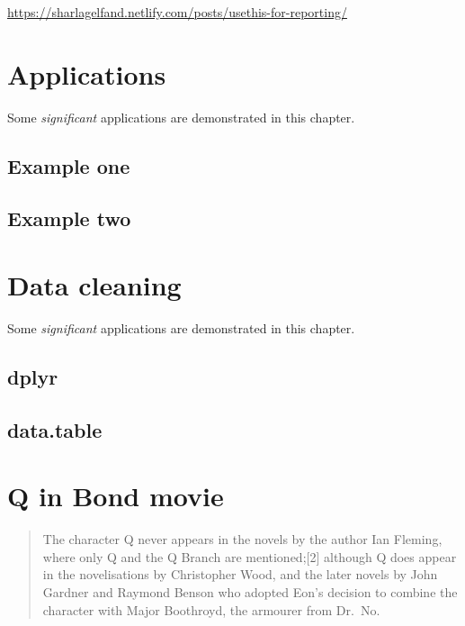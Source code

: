 \documentclass[]{book}
\begin{document}
\url{https://sharlagelfand.netlify.com/posts/usethis-for-reporting/}

\hypertarget{applications}{%
\chapter{Applications}\label{applications}}

Some \emph{significant} applications are demonstrated in this chapter.

\hypertarget{example-one}{%
\section{Example one}\label{example-one}}

\hypertarget{example-two}{%
\section{Example two}\label{example-two}}

\hypertarget{data-cleaning}{%
\chapter{Data cleaning}\label{data-cleaning}}

Some \emph{significant} applications are demonstrated in this chapter.

\hypertarget{dplyr}{%
\section{dplyr}\label{dplyr}}

\hypertarget{data.table}{%
\section{data.table}\label{data.table}}

\hypertarget{q-in-bond-movie}{%
\chapter{Q in Bond movie}\label{q-in-bond-movie}}

\begin{quote}
The character Q never appears in the novels by the author Ian Fleming, where only Q and the Q Branch are mentioned;{[}2{]} although Q does appear in the novelisations by Christopher Wood, and the later novels by John Gardner and Raymond Benson who adopted Eon's decision to combine the character with Major Boothroyd, the armourer from Dr.~No.
\end{quote}
\end{document}
